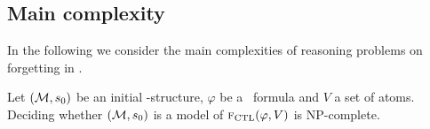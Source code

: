 \documentclass{article}
\begin{document}
\subsection{Main complexity}
In the following we consider the main complexities of reasoning problems on forgetting in \CTL.
\begin{proposition}\label{modelChecking}
Let $({\cal M},s_0)$ be an initial \MPK-structure, $\varphi$ be a \CTL\ formula and $V$ a set of atoms. Deciding whether $({\cal M},s_0)$ is a model of ${\textsc{f}_{\textrm{CTL}}}(\varphi, V )$ is NP-complete.
\end{proposition}
\end{document}
